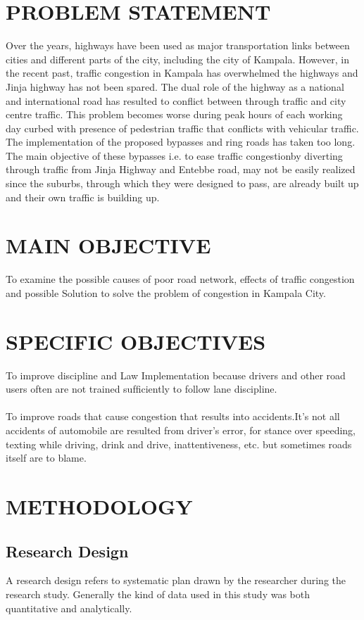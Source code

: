 \documentclass[11pt,A4paper]{article}
\begin{document}
\section{PROBLEM STATEMENT}
 Over the years, highways have been used as major transportation links between cities and
different parts of the city, including the city of Kampala. However, in the recent past, traffic
congestion in Kampala has overwhelmed the highways and Jinja highway has not been spared.
The dual role of the highway as a national and international road has resulted to conflict between
through traffic and city centre traffic. This problem becomes worse during peak hours of each
working day curbed with presence of pedestrian traffic that conflicts with vehicular traffic.
The implementation of the proposed bypasses and ring roads has taken too long. The main
objective of these bypasses i.e. to ease traffic congestionby diverting through traffic
from Jinja Highway and Entebbe road, may not be easily realized since the suburbs, through
which they were designed to pass, are already built up and their own traffic is building up. 
\section{MAIN OBJECTIVE}
To examine the possible causes of poor road network, effects of traffic congestion and possible Solution to solve the problem of congestion in Kampala City. 

\section{SPECIFIC OBJECTIVES}
To improve discipline and Law Implementation because drivers and other road users often are not trained sufﬁciently to follow lane discipline.\\ \\
To improve roads that cause congestion that results into accidents.It’s not all accidents of automobile are resulted from driver’s error, for stance over speeding, texting while driving, drink and drive, inattentiveness, etc.  but sometimes roads itself are to blame.  

\section{METHODOLOGY}
\subsection{Research Design}
A research design refers to systematic plan drawn by the researcher during the research study. Generally the kind of data used in this study was both quantitative and analytically.
\end{document}
